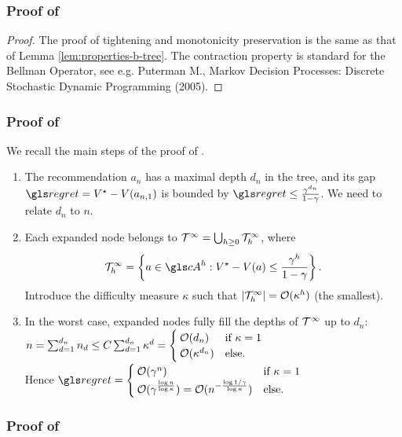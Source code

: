 \begin{subappendices}
\subsubsection{Proof of }
\begin{proof}
The proof of tightening and monotonicity preservation is the same as that of Lemma \ref{lem:properties-b-tree}.
The contraction property is standard for the Bellman Operator, see e.g. Puterman M., Markov Decision Processes: Discrete Stochastic Dynamic Programming (2005).
\end{proof}

\subsubsection{Proof of }
We recall the main steps of the proof of \citet{Hren2008}.\\

\begin{enumerate}
	\item The recommendation $a_n$ has a maximal depth $d_n$ in the tree, and its gap $\regret = V^\star - V({a_{n,1}})$ is bounded by $\regret \leq \frac{\gamma^{d_n}}{1-\gamma}$. We need to relate $d_n$ to $n$.
	
	\item Each expanded node belongs to $\mathcal{T}^\infty = \bigcup_{h\geq 0} \mathcal{T}_h^\infty$, where $$\Tau_h^\infty = \left\{a\in \cA^h: V^\star-V(a) \leq \frac{\gamma^h}{1-\gamma}\right\}.$$ Introduce the difficulty measure $\kappa$ such that $|\mathcal{T}_h^\infty| = \mathcal{O}(\kappa^h)$ (the smallest).
	
	\item In the worst case, expanded nodes fully fill the depths of $\mathcal{T}^\infty$ up to $d_n$: $n = \sum_{d=1}^{d_n} n_d \leq  C\sum_{d=1}^{d_n} \kappa^d = \begin{cases}
	\mathcal{O}(d_n) &\text{if $\kappa=1$}\\
	\mathcal{O}(\kappa^{d_n}) &\text{else.}
	\end{cases}$\\
	Hence $\regret = \begin{cases}
	\cO(\gamma^n) &\text{if $\kappa=1$}\\
	\cO(\gamma^{\frac{\log n}{\log \kappa}}) = \cO(n^{-\frac{\log 1/\gamma}{\log \kappa}}) &\text{else.}
	\end{cases}$
\end{enumerate}

\subsubsection{Proof of }


\end{subappendices}
